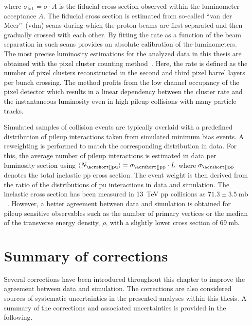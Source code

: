 where $\sigma_\mathrm{fid.}=\sigma\cdot A$ is the fiducial cross section observed within the luminometer acceptance $A$. The fiducial cross section is estimated from so-called ``van der Meer''~(\gls{vdm}) scans during which the proton beams are first separated and then gradually crossed with each other. By fitting the rate as a function of the beam separation in such scans provides an absolute calibration of the luminometers. The most precise luminosity estimations for the analyzed data in this thesis are obtained with the pixel cluster counting method~\cite{CMS-PAS-LUM-13-001,CMS-PAS-LUM-15-001,CMS-PAS-LUM-17-001}. Here, the rate is defined as the number of pixel clusters reconstructed in the second and third pixel barrel layers per bunch crossing. The method profits from the low channel occupancy of the pixel detector which results in a linear dependency between the cluster rate and the instantaneous luminosity even in high pileup collisions with many particle tracks.

Simulated samples of collision events are typically overlaid with a predefined distribution of pileup interactions taken from simulated minimum bias events. A reweighting is performed to match the corresponding distribution in data. For this, the average number of pileup interactions is estimated in data per luminosity section using $\langle N_\mathrm{\gls{pu}}\rangle=\sigma_\mathrm{\gls{pp}}\cdot L$ where $\sigma_\mathrm{\gls{pp}}$ denotes the total inelastic \gls{pp} cross section. The event weight is then derived from the ratio of the distributions of \gls{pu} interactions in data and simulation. The inelastic cross section has been measured in 13~TeV \gls{pp} collisions as $71.3\pm3.5~\mathrm{mb}$~\cite{CMS-PAS-FSQ-15-005}. However, a better agreement between data and simulation is obtained for pileup sensitive observables such as the number of primary vertices or the median of the transverse energy density, $\rho$, with a slightly lower cross section of $69~\mathrm{mb}$.


\section{Summary of corrections}
\label{sec:reconstruction-summary}

Several corrections have been introduced throughout this chapter to improve the agreement between data and simulation. The corrections are also considered sources of systematic uncertainties in the presented analyses within this thesis. A summary of the corrections and associated uncertainties is provided in the following.

